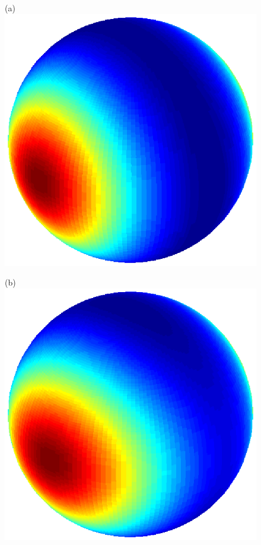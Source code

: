 \documentclass[dvips,aoas,preprint]{imsart}
\numberwithin{equation}{section}
\theoremstyle{plain}
\begin{document}
\begin{figure}[!htbp]
    \begin{minipage}[]{0.12\textwidth}
      \centering
      (a)
      \includegraphics*[width=\textwidth]{figure1a1.eps}
    \end{minipage}
    \begin{minipage}[]{0.12\textwidth}
      \centering
      (b)
      \includegraphics*[width=\textwidth]{figure1e1.eps}

\end{minipage}
\end{figure}
\end{document}
